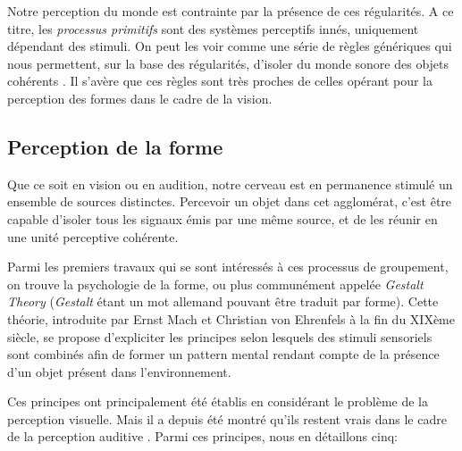 Notre perception du monde est contrainte par la présence de ces régularités. A ce titre, les \emph{processus primitifs} sont des systèmes perceptifs innés, uniquement dépendant des stimuli. On peut les voir comme une série de règles génériques qui nous permettent, sur la base des régularités, d'isoler du monde sonore des objets cohérents \citep{ballas1987interpreting}. Il s'avère que ces règles sont très proches de celles opérant pour la perception des formes dans le cadre de la vision.  

\subsection{Perception de la forme}

Que ce soit en vision ou en audition, notre cerveau est en permanence stimulé un ensemble de sources distinctes. Percevoir un objet dans cet agglomérat, c'est être capable d'isoler tous les signaux émis par une même source, et de les réunir en une unité perceptive cohérente.

Parmi les premiers travaux qui se sont intéressés à ces processus de groupement, on trouve la psychologie de la forme, ou plus communément appelée \emph{Gestalt Theory} (\emph{Gestalt} étant un mot allemand pouvant être traduit par forme). Cette théorie, introduite par Ernst Mach et Christian von Ehrenfels à la fin du XIXème siècle, se propose d'expliciter les principes selon lesquels des stimuli sensoriels sont combinés afin de former un pattern mental rendant compte de la présence d'un objet présent dans l'environnement. 

Ces principes ont principalement été établis en considérant le problème de la perception visuelle. Mais il a depuis été montré qu'ils restent vrais dans le cadre de la perception auditive \citep[ch. 1]{bregman1994auditory}. Parmi ces principes, nous en détaillons cinq:


